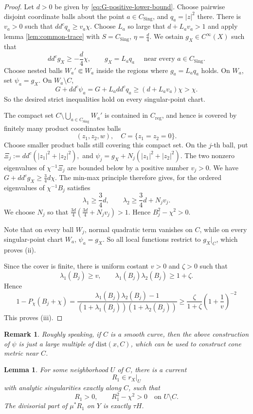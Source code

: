 \documentclass[reqno]{amsart}
\theoremstyle{remark}
\newcommand{\ddc}{dd^c}
\newcommand{\reg}{\text{reg}}
\newcommand{\sing}{\text{Sing}}
\theoremstyle{plain}
\newtheorem{lemma}[thm]{Lemma}
\newtheorem{remark}[thm]{Remark}
\begin{document}
\begin{proof}  Let $d>0$ be given by
\eqref{eq:G-positive-lower-bound}.  
Choose pairwise disjoint coordinate balls about the point $a\in C_{\sing}$, and $q_a=|z|^2$ there. There is $v_a>0$ such that $\ddc q_a\geq v_a\chi$. Choose $L_a$ so large that $d+L_av_a>1$ and apply lemma \ref{lem:common-trace} with $S=C_\sing$, $\eta=\frac{d}{4}$. We ostain $g_X\in C^\infty(X)$ such that \[
\ddc g_X\geq -\frac{d}{4}\chi, \qquad g_X=L_aq_a\quad \text{ near every }a\in C_\sing.
\]
Choose nested balls $W_a'\Subset W_a$ inside the regions where $g_a=L_aq_a$ holds. On $W_a$, set $\psi_a=g_X$. On $W_a\setminus C$, \[
G+\ddc\psi_a=G+L_a\ddc q_a\geq (d+L_av_a)\chi>\chi. 
\] So the desired strict inequalities hold on every singular-point chart.

The compact set $C\setminus \bigcup_{a\in C_\sing}W_a'$ is contained in $C_\reg$, and hence is covered by finitely many product coordinates balls \[
(z_1,z_2,w),\quad C=\{z_1=z_2=0\}.
\] 
Choose smaller product balls still covering this compact set. On the $j$-th ball, put $\Xi_j:=\ddc(|z_1|^2+|z_2|^2),$ and $\psi_j=g_X+N_j(|z_1|^2+|z_2|^2)$. The two nonzero eigenvalues of $\chi^{-1}\Xi_j$ are bounded below by a positive number $v_j>0$. We have $G+\ddc g_X\geq \frac{3}{4}d\chi$. The min-max principle therefore gives, for the ordered eigenvalues of $\chi^{-1}B_j$ satisfies \[
\lambda_1\geq \frac{3}{4}d,\qquad \lambda_2\geq \frac{3}{4}d+N_jv_j.
\]
We choose $N_j$ so that $\frac{3d}{4}\left(\frac{3d}{4}+N_jv_j\right)>1$. Hence $B_j^2-\chi^2>0$.

Note that on every ball $W_j$, normal quadratic term vanishes on $C$, while on every singular-point chart $W_a$, $\psi_a=g_X$. So all local functions restrict to $g_X|_C$, which proves (ii).

Since the cover is finite, there is uniform costant $v>0$ and $\zeta>0$ such that \[
\lambda_1(B_j)\geq v,\qquad \lambda_1(B_j)\lambda_2(B_j)\geq 1+\zeta. 
\]Hence \[
1-P_\chi(B_j+\chi)=\frac{\lambda_1(B_j)\lambda_2(B_j)-1}{(1+\lambda_1(B_j))(1+\lambda_2(B_j))}\geq \frac{\zeta}{1+\zeta}\left(1+\frac{1}{v}\right)^{-2}
\]This proves (iii). 

\end{proof}

\begin{remark}
    Roughly speaking, if $C$ is a smooth curve, then the above construction of $\psi$ is just a large multiple of  $\text{dist}(x,C)$, which can be used to construct cone metric near $C$.
\end{remark}
\begin{lemma}
\label{lem:finite-richberg}
For some neighborhood $U$ of $C$, there is a current
\[
 R_1\in r_X|_U
\]
with analytic singularities exactly along $C$, such that
\[
 R_1>0,\qquad R_1^2-\chi^2>0
 \quad\text{on }U\setminus C.
\]
The divisorial part of $\mu^*R_1$ on $Y$ is exactly $\tau H$.
\end{lemma}
\end{document}
